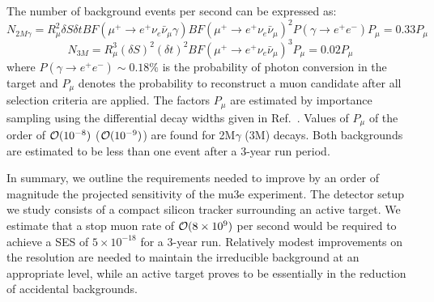 The number of background events per second can be expressed as:
%
$$N_{2M\gamma} = R_\mu^2 \delta S \delta t BF(\mu^+ \rightarrow e^+ \nu_e \bar\nu_\mu \gamma) BF(\mu^+ \rightarrow e^+ \nu_e \bar\nu_\mu)^2 P(\gamma \rightarrow e^+ e^-)  P_\mu  = 0.33 P_\mu$$
$$N_{3M} = R_\mu^3(\delta S)^2 (\delta t)^2 BF(\mu^+ \rightarrow e^+ \nu_e \bar\nu_\mu)^3 P_\mu = 0.02 P_\mu$$
%
where $P(\gamma \rightarrow e^+ e^-)\sim 0.18\%$ is the probability of photon conversion in the target and $P_\mu$ denotes the probability to reconstruct a muon candidate after all selection criteria are applied. The factors $P_\mu$ are estimated by importance sampling using the differential decay widths given in Ref.~\cite{Kuno:1999jp,Djilkibaev:2008jy}. Values of $P_\mu$ of the order of ${\cal O}(10^{-8})$ (${\cal O}(10^{-9})$) are found for 2M$\gamma$ (3M) decays. Both backgrounds are estimated to be less than one event after a 3-year run period.


In summary, we outline the requirements needed to improve by an order of magnitude the projected sensitivity of the mu3e experiment. The detector setup we study consists of a compact silicon tracker surrounding an active target. We estimate that a stop muon rate of ${\cal O}(8\times 10^{9})$ per second would be required to achieve a SES of $5\times 10^{-18}$ for a 3-year run. Relatively modest improvements on the resolution are needed to maintain the irreducible background at an appropriate level, while an active target proves to be essentially in the reduction of accidental backgrounds. 


